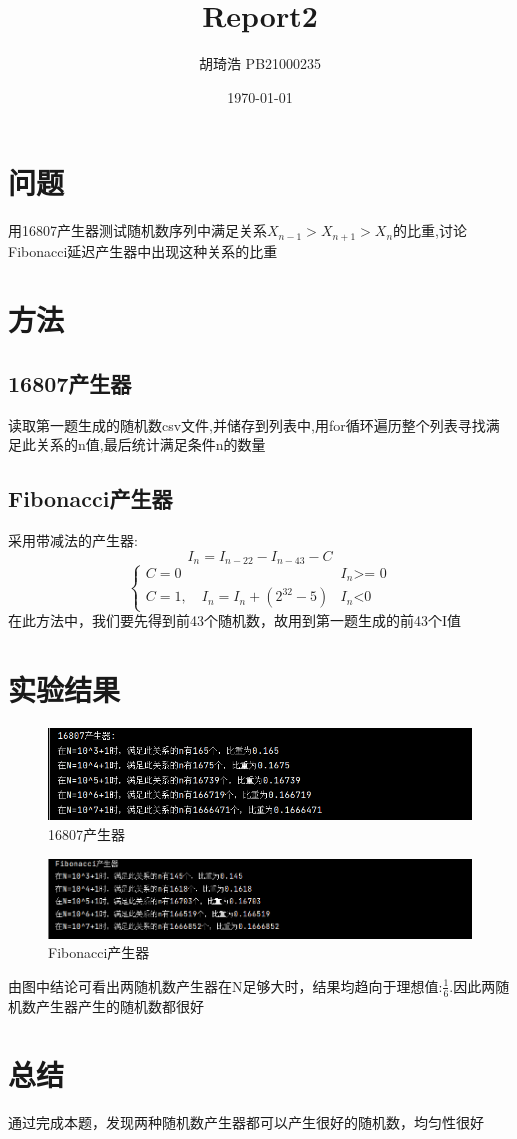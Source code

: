 \documentclass[UTF8]{ctexart}
\title{\textbf{Report2}}
\author{胡琦浩  PB21000235}
\date{\today}
\begin{document}
\maketitle
\section{问题}
用16807产生器测试随机数序列中满足关系$X_{n-1}>X_{n+1}>X_n$的比重,讨论Fibonacci延迟产生器中出现这种关系的比重

\section{方法}
\subsection{16807产生器}
读取第一题生成的随机数csv文件,并储存到列表中,用for循环遍历整个列表寻找满足此关系的n值,最后统计满足条件n的数量

\subsection{Fibonacci产生器}
采用带减法的产生器:
\begin{equation}
    I_n=I_{n-22}-I_{n-43}-C
\end{equation}
\begin{equation}
    \begin{cases}
        C=0  & I_n\mbox{>=  0} \\
        C=1,\quad I_n=I_n+(2^{32}-5) & I_n\mbox{<0}
    \end{cases}
\end{equation}
在此方法中，我们要先得到前43个随机数，故用到第一题生成的前43个I值

\section{实验结果}
\begin{figure}[htbp]
    \centering
    \includegraphics[scale=0.5]{1}
    \caption{16807产生器}
\end{figure}
\begin{figure}[htbp]
    \centering
    \includegraphics[scale=0.5]{2}
    \caption{Fibonacci产生器}
\end{figure}
由图中结论可看出两随机数产生器在N足够大时，结果均趋向于理想值:$\frac{1}{6}$.因此两随机数产生器产生的随机数都很好

\section{总结}
通过完成本题，发现两种随机数产生器都可以产生很好的随机数，均匀性很好
\end{document}
